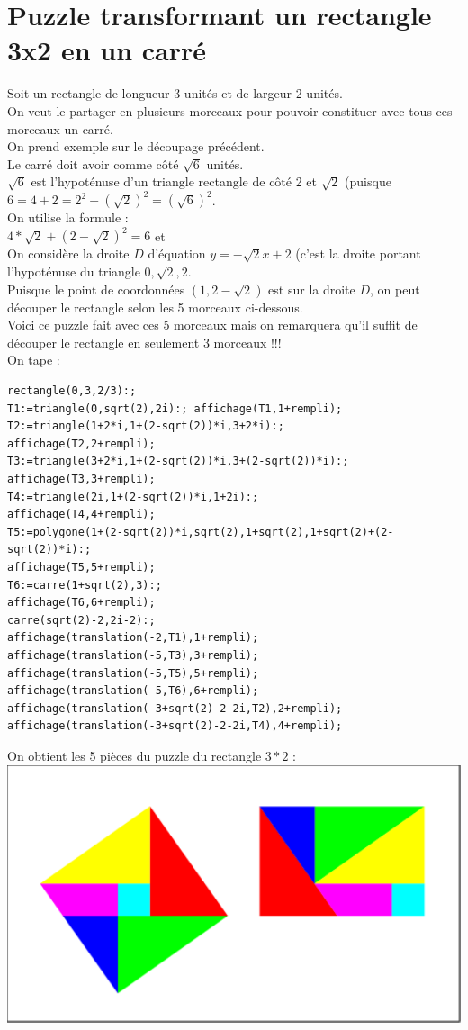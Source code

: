 \documentclass[a4paper,11pt]{book}
\begin{document}
\section{Puzzle transformant un rectangle 3x2 en un carr\'e}
Soit un rectangle de longueur 3 unit\'es et de largeur 2 unit\'es.\\
On veut le partager en plusieurs morceaux pour pouvoir constituer avec 
tous ces morceaux un carr\'e.\\
On prend exemple sur le d\'ecoupage pr\'ec\'edent.\\
Le carr\'e doit avoir comme c\^ot\'e $\sqrt 6$ unit\'es.\\
$\sqrt 6$ est l'hypot\'enuse d'un triangle rectangle de c\^ot\'e 2 et 
$\sqrt 2$ (puisque $6=4+2=2^2+(\sqrt 2)^2=(\sqrt 6)^2$.\\
On utilise la formule :\\
$4*\sqrt 2+(2-\sqrt 2)^2=6$ et\\
On consid\`ere la droite $D$ d'\'equation $y=-\sqrt 2x+2$ (c'est la droite
portant l'hypot\'enuse du triangle $0,\sqrt 2,2$.\\
Puisque le point de coordonn\'ees $(1,2-\sqrt 2)$ est sur la droite $D$, on 
peut d\'ecouper le rectangle selon les 5 morceaux ci-dessous.\\
Voici ce puzzle fait avec ces 5 morceaux mais on remarquera qu'il suffit de 
d\'ecouper le rectangle en seulement 3 morceaux !!!\\
On tape :
\begin{verbatim}
rectangle(0,3,2/3):;
T1:=triangle(0,sqrt(2),2i):; affichage(T1,1+rempli);
T2:=triangle(1+2*i,1+(2-sqrt(2))*i,3+2*i):; 
affichage(T2,2+rempli);
T3:=triangle(3+2*i,1+(2-sqrt(2))*i,3+(2-sqrt(2))*i):; 
affichage(T3,3+rempli);
T4:=triangle(2i,1+(2-sqrt(2))*i,1+2i):; 
affichage(T4,4+rempli);
T5:=polygone(1+(2-sqrt(2))*i,sqrt(2),1+sqrt(2),1+sqrt(2)+(2-sqrt(2))*i):; 
affichage(T5,5+rempli);
T6:=carre(1+sqrt(2),3):;
affichage(T6,6+rempli);
carre(sqrt(2)-2,2i-2):;
affichage(translation(-2,T1),1+rempli);
affichage(translation(-5,T3),3+rempli);
affichage(translation(-5,T5),5+rempli);
affichage(translation(-5,T6),6+rempli);
affichage(translation(-3+sqrt(2)-2-2i,T2),2+rempli);
affichage(translation(-3+sqrt(2)-2-2i,T4),4+rempli);
\end{verbatim}
On obtient les 5 pi\`eces du puzzle du rectangle $3*2$ :\\
\includegraphics[width=\textwidth]{carresqrt6}
\end{document}
